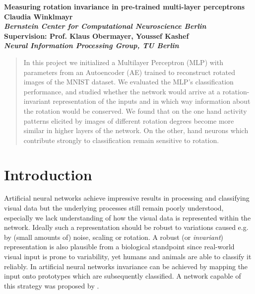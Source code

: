 \documentclass[10pt,a4paper]{article}
\begin{document}
\vspace{5mm}
\begin{flushleft}
{\LARGE \textbf{Measuring rotation invariance in
pre-trained multi-layer perceptrons}}\\
\vspace{10mm}
{\small \textbf{Claudia Winklmayr\\ 
\textit{Bernstein Center for Computational Neuroscience Berlin}\\
Supervision: Prof. Klaus Obermayer, Youssef Kashef\\
\textit{Neural Information Processing Group, TU Berlin}
}}
\vspace{5mm}
\end{flushleft}

\begin{abstract}
\noindent In this project we initialized a Multilayer Perceptron (MLP) with parameters from an Autoencoder (AE) trained to reconstruct rotated images of the MNIST dataset. We evaluated the MLP's classification performance, and studied whether the network would arrive at a rotation-invariant representation of the inputs and in which way information about the rotation would be conserved. We found that on the one hand activity patterns elicited by images of different rotation degrees become more similar in higher layers of the network. On the other, hand neurons which contribute strongly to classification remain sensitive to rotation.
\end{abstract}

\section{Introduction}

Artificial neural networks achieve impressive results in processing and classifying visual data but the underlying processes still remain poorly understood, especially we lack understanding of how the visual data is represented within the network. Ideally such a representation should be robust to variations caused e.g. by (small amounts of) noise, scaling or rotation. A robust (or \textit{invariant}) representation is also plausible from a biological standpoint since real-world visual input is prone to variability, yet humans and animals are able to classify it reliably. In artificial neural networks invariance can be achieved by mapping the input onto prototypes which are subsequently classified. A network capable of this strategy was proposed by \cite{Olshausen}. 
\newline
\end{document}
